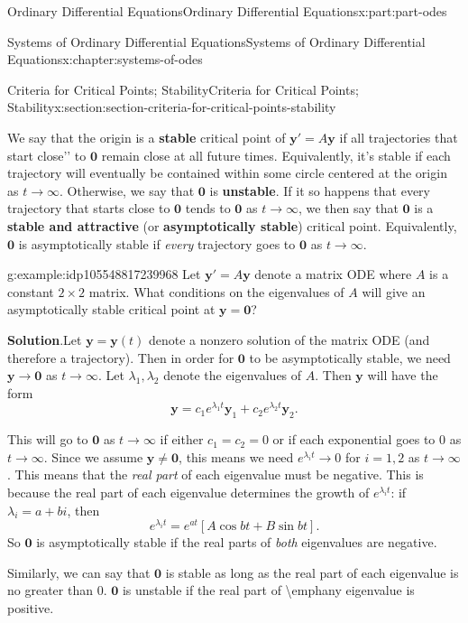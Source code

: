 \documentclass[twoside,10pt,]{book}
\newcommand{\blocktitlefont}{\relax}
\newcommand{\terminology}[1]{\textbf{#1}}
\numberwithin{equation}{part}
\renewcommand{\vec}[1]{\mathbf{#1}}
\begin{document}
\begin{partptx}{Ordinary Differential Equations}{}{Ordinary Differential Equations}{}{}{x:part:part-odes}
\begin{chapterptx}{Systems of Ordinary Differential Equations}{}{Systems of Ordinary Differential Equations}{}{}{x:chapter:systems-of-odes}
\begin{sectionptx}{Criteria for Critical Points; Stability}{}{Criteria for Critical Points; Stability}{}{}{x:section:section-criteria-for-critical-points-stability}
\par
We say that the origin is a \terminology{stable} critical point of \(\vec{y}'=A\vec{y}\) if all trajectories that start \textasciigrave{}\textasciigrave{}close'{}'{} to \(\vec{0}\) remain close at all future times. Equivalently, it's stable if each trajectory will eventually be contained within some circle centered at the origin as \(t\to\infty\). Otherwise, we say that \(\vec{0}\) is \terminology{unstable}. If it so happens that every trajectory that starts close to \(\vec{0}\) tends to \(\vec{0}\) as \(t\to\infty\), we then say that \(\vec{0}\) is a \terminology{stable and attractive} (or \terminology{asymptotically stable}) critical point. Equivalently, \(\vec{0}\) is asymptotically stable if \emph{every} trajectory goes to \(\vec{0}\) as \(t\to\infty\).%
\begin{example}{}{g:example:idp105548817239968}%
Let \(\vec{y}' = A\vec{y}\) denote a matrix ODE where \(A\) is a constant \(2\times2\) matrix. What conditions on the eigenvalues of \(A\) will give an asymptotically stable critical point at \(\vec{y}=\vec{0}\)?%
\par\smallskip%
\noindent\textbf{\blocktitlefont Solution}.\hypertarget{g:solution:idp105548817274656}{}\quad{}Let \(\vec{y} = \vec{y}(t)\) denote a nonzero solution of the matrix ODE (and therefore a trajectory). Then in order for \(\vec{0}\) to be asymptotically stable, we need \(\vec{y}\to\vec{0}\) as \(t\to\infty\). Let \(\lambda_{1},\lambda_{2}\) denote the eigenvalues of \(A\). Then \(\vec{y}\) will have the form%
\begin{equation*}
\vec{y} = c_{1}e^{\lambda_{1}t}\vec{y}_{1}+c_{2}e^{\lambda_{2}t}\vec{y}_{2}.
\end{equation*}
%
\par
This will go to \(\vec{0}\) as \(t\to\infty\) if either \(c_{1}=c_{2}=0\) or if each exponential goes to \(0\) as \(t\to\infty\). Since we assume \(\vec{y}\neq\vec{0}\), this means we need \(e^{\lambda_{i}t}\to0\) for \(i=1,2\) as \(t\to\infty\). This means that the \emph{real part} of each eigenvalue must be negative. This is because the real part of each eigenvalue determines the growth of \(e^{\lambda_{i}t}\): if \(\lambda_{i} = a+bi\), then%
\begin{equation*}
e^{\lambda_{i}t} = e^{at}[A\cos bt+B\sin bt]\text{.}
\end{equation*}
So \(\vec{0}\) is asymptotically stable if the real parts of \emph{both} eigenvalues are negative.%
\end{example}
Similarly, we can say that \(\vec{0}\) is stable as long as the real part of each eigenvalue is no greater than \(0\). \(\vec{0}\) is unstable if the real part of \textbackslash{}emph\textbraceleft{}any\textbraceright{} eigenvalue is positive.%

\end{sectionptx}
\end{chapterptx}
\end{partptx}
\end{document}
